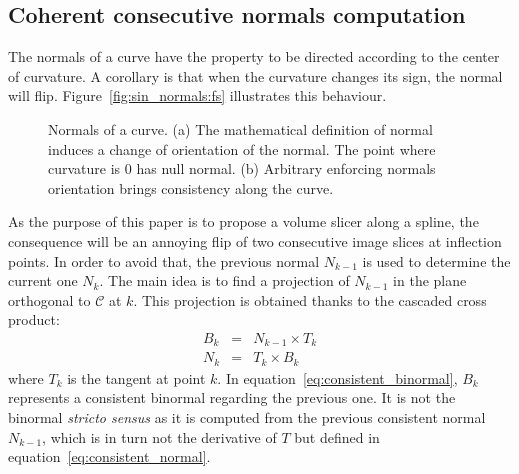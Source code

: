 \documentclass{InsightArticle}
\begin{document}
\subsection{Coherent consecutive normals computation}
%
The normals of a curve have the property to be directed according to the 
center of curvature. A corollary is that when the curvature changes its sign,
the normal will flip. Figure~\ref{fig:sin_normals:fs} illustrates this 
behaviour.
%
\begin{figure}
\centering
{}
\caption{Normals of a curve. (a) The mathematical definition of normal induces
a change of orientation of the normal. The point where curvature is $0$ has 
null normal. (b) Arbitrary enforcing normals orientation brings consistency
along the curve.}
\end{figure}
%
As the purpose of this paper is to propose a volume slicer along a spline, the
consequence will be an annoying flip of two consecutive image slices at 
inflection points. In order to avoid that, the previous normal $N_{k-1}$ is
used to determine the current one $N_k$. The main idea is to find a projection 
of $N_{k-1}$ in the plane orthogonal to $\mathcal{C}$ at $k$. This projection
is obtained thanks to the cascaded cross product:
%
\begin{eqnarray}
B_k &=& N_{k-1} \times T_k \label{eq:consistent_binormal}\\ 
N_k &=& T_k \times B_k \label{eq:consistent_normal}
\end{eqnarray}
%
where $T_k$ is the tangent at point $k$. In 
equation~\eqref{eq:consistent_binormal}, $B_k$ represents a consistent binormal
regarding the previous one. It is not the binormal \textit{stricto sensus} as
it is computed from the previous consistent normal $N_{k-1}$, which is in turn
not the derivative of $T$ but defined in equation~\eqref{eq:consistent_normal}.
\end{document}
